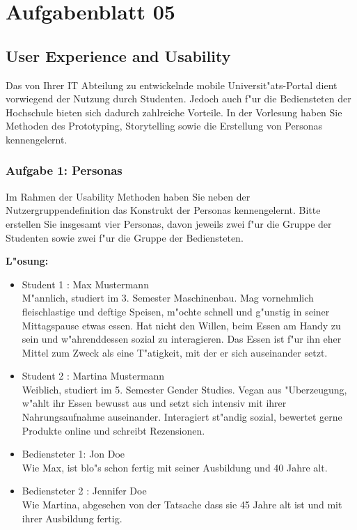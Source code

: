 

\chapter{Aufgabenblatt 05}

\section{ User Experience and Usability }
Das  von  Ihrer  IT  Abteilung  zu  entwickelnde  mobile  Universit"ats-Portal  dient  vorwiegend  der Nutzung  durch  Studenten.  
Jedoch  auch  f"ur  die  Bediensteten  der  Hochschule  bieten  sich dadurch  zahlreiche  Vorteile.  
In  der  Vorlesung  haben  Sie  Methoden  des  Prototyping, Storytelling sowie die Erstellung von Personas kennengelernt. 


\subsection{Aufgabe 1: Personas}
Im  Rahmen  der  Usability  Methoden  haben  Sie  neben  der  Nutzergruppendefinition  das Konstrukt der Personas kennengelernt.  
Bitte erstellen Sie insgesamt vier Personas, davon jeweils zwei f"ur die Gruppe der Studenten sowie zwei f"ur die Gruppe der Bediensteten. 

\textbf{L"osung:}
\begin{itemize}
    \item Student 1 : Max Mustermann\\
        M"annlich, studiert im 3. Semester Maschinenbau.
        Mag vornehmlich fleischlastige und deftige Speisen, m"ochte schnell und g"unstig in seiner Mittagspause etwas essen.
        Hat nicht den Willen, beim Essen am Handy zu sein und w"ahrenddessen sozial zu interagieren.
        Das Essen ist f"ur ihn eher Mittel zum Zweck als eine T"atigkeit, mit der er sich auseinander setzt.
    \item Student 2 : Martina Mustermann\\
        Weiblich, studiert im 5. Semester Gender Studies.
        Vegan aus "Uberzeugung, w"ahlt ihr Essen bewusst aus und setzt sich intensiv mit ihrer Nahrungsaufnahme auseinander.
        Interagiert st"andig sozial, bewertet gerne Produkte online und schreibt Rezensionen.
    \item Bediensteter 1: Jon Doe\\
        Wie Max, ist blo"s schon fertig mit seiner Ausbildung und 40 Jahre alt. 
    \item Bediensteter 2 : Jennifer Doe\\
        Wie Martina, abgesehen von der Tatsache dass sie 45 Jahre alt ist und mit ihrer Ausbildung fertig.
\end{itemize}

